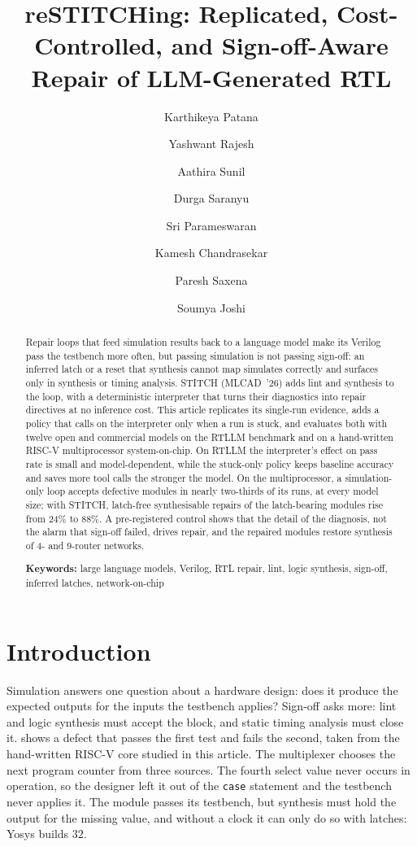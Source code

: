 \documentclass[11pt]{article}
\title{\sffamily\bfseries reSTITCHing: Replicated, Cost-Controlled, and Sign-off-Aware\\Repair of LLM-Generated RTL}
\author{\sffamily Karthikeya Patana \and \sffamily Yashwant Rajesh \and \sffamily Aathira Sunil \and
  \sffamily Durga Saranyu \and \sffamily Sri Parameswaran \and \sffamily Kamesh Chandrasekar \and
  \sffamily Paresh Saxena \and \sffamily Soumya Joshi}
\date{}
\begin{document}
\maketitle

\begin{abstract}
\noindent Repair loops that feed simulation results back to a language model
make its Verilog pass the testbench more often, but passing simulation is not
passing sign-off: an inferred latch or a reset that synthesis cannot map
simulates correctly and surfaces only in synthesis or timing analysis. STITCH
(MLCAD~'26) adds lint and synthesis to the loop, with a deterministic
interpreter that turns their diagnostics into repair directives at no inference
cost. This article replicates its single-run evidence, adds a policy that calls
on the interpreter only when a run is stuck, and evaluates both with twelve
open and commercial models on the RTLLM benchmark and on a hand-written RISC-V
multiprocessor system-on-chip. On RTLLM the interpreter's effect on pass rate is
small and model-dependent, while the stuck-only policy keeps baseline accuracy
and saves more tool calls the stronger the model. On the multiprocessor, a
simulation-only loop accepts defective modules in nearly two-thirds of its runs,
at every model size; with STITCH, latch-free synthesisable repairs of the
latch-bearing modules rise from 24\% to 88\%. A pre-registered control shows
that the detail of the diagnosis, not the alarm that sign-off failed, drives
repair, and the repaired modules restore synthesis of 4- and 9-router networks.

\medskip
\noindent\textbf{\sffamily Keywords:} large language models, Verilog, RTL
repair, lint, logic synthesis, sign-off, inferred latches, network-on-chip
\end{abstract}

\section{Introduction}
\label{sec:intro}

Simulation answers one question about a hardware design: does it produce the
expected outputs for the inputs the testbench applies? Sign-off asks more: lint
and logic synthesis must accept the block, and static timing analysis must
close it.  shows a defect that passes the first test and
fails the second, taken from the hand-written RISC-V core studied in this
article. The multiplexer chooses the next program counter from three sources.
The fourth select value never occurs in operation, so the designer left it out
of the \texttt{case} statement and the testbench never applies it. The module
passes its testbench, but synthesis must hold the output for the missing value,
and without a clock it can only do so with latches: Yosys builds $32$.
\end{document}
